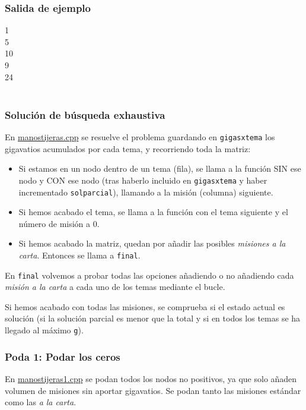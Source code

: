 \documentclass{article}
\newenvironment{caja}{
	\begingroup
	\ttfamily\noindent
	\tabularx{\linewidth}{|X|}\hline
}
{
	\hline\endtabularx
	\normalfont
	\endgroup
}
\begin{document}
	\subsubsection*{Salida de ejemplo}
	\begin{caja}
		1\\
		5\\
		10\\
		9\\
		24\\
	\end{caja}\\

	\newpage
	
	\subsubsection*{Solución de búsqueda exhaustiva}
	En \href{run:manostijeras.cpp}{manostijeras.cpp} se resuelve el problema guardando en \texttt{gigasxtema} los gigavatios acumulados por cada tema, y recorriendo toda la matriz: 
	\begin{itemize}
		\item Si estamos en un nodo dentro de un tema (fila), se llama a la función SIN ese nodo y CON ese nodo (tras haberlo incluido en \texttt{gigasxtema} y haber incrementado \texttt{solparcial}), llamando a la misión (columna) siguiente.
		\item Si hemos acabado el tema, se llama a la función con el tema siguiente y el número de misión a 0.
		\item Si hemos acabado la matriz, quedan por añadir las posibles \textit{misiones a la carta}. Entonces se llama a \texttt{final}.
	\end{itemize}

	En \texttt{final} volvemos a probar todas las opciones añadiendo o no añadiendo cada \textit{misión a la carta} a cada uno de los temas mediante el bucle.
	
	Si hemos acabado con todas las misiones, se comprueba si el estado actual es solución (si la solución parcial es menor que la total y si en todos los temas se ha llegado al máximo \texttt{g}).\\
	
	\subsubsection*{Poda 1: Podar los ceros}
	En \href{run:manostijeras1.cpp}{manostijeras1.cpp} se podan todos los nodos no positivos, ya que solo añaden volumen de misiones sin aportar gigavatios. Se podan tanto las misiones estándar como las \textit{a la carta}.\\
	
\end{document}
